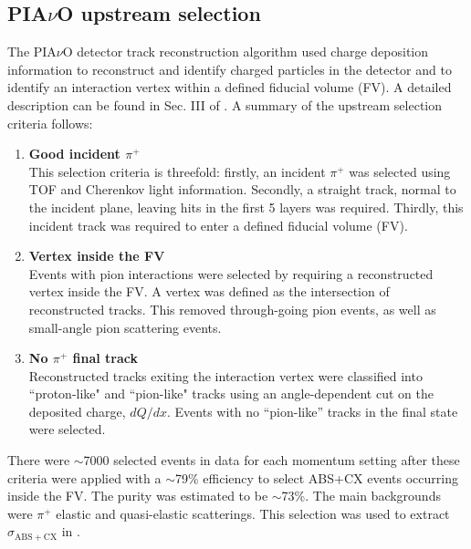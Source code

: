 \subsection{PIA$\nu$O upstream selection}
The PIA$\nu$O detector track reconstruction algorithm used charge deposition information to reconstruct and identify charged particles in the detector and to identify an interaction vertex within a defined fiducial volume (FV). A detailed description can be found in Sec. III of \cite{duet}. A summary of the upstream selection criteria follows:
\begin{enumerate}
\item {\bf Good incident $\pi^{+}$\\}
This selection criteria is threefold: firstly, an incident $\pi^{+}$ was selected using TOF and Cherenkov light information. Secondly, a straight track, normal to the incident plane, leaving hits in the first 5 layers was required. Thirdly, this incident track was required to enter a defined fiducial volume (FV).
\item {\bf Vertex inside the FV\\}
Events with pion interactions were selected by requiring a reconstructed vertex inside the FV. {\color{red} A vertex was defined as the intersection of reconstructed tracks.} This removed through-going pion events, as well as small-angle pion scattering events.
\item {\bf No $\pi^{+}$ final track\\}
Reconstructed tracks exiting the interaction vertex were classified into ``proton-like" and ``pion-like" tracks using an angle-dependent cut on the deposited charge, $dQ/dx$. Events with no ``pion-like'' tracks in the final state were selected.
\end{enumerate}
There were $\sim$7000 selected events in data {\color{red} for each momentum setting} after these criteria were applied with a $\sim$79\% efficiency to select ABS+CX events occurring inside the FV. The purity was estimated to be $\sim$73\%. The main backgrounds were $\pi^{+}$ elastic and quasi-elastic scatterings. This selection was used to extract $\sigma{_\mathrm{ABS+CX}}$ in \cite{duet}.

